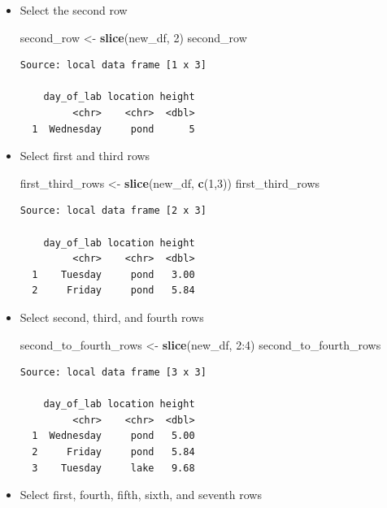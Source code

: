 \documentclass[twoside, 12pt]{article}
\newenvironment{Shaded}{\begin{snugshade}}{\end{snugshade}}
\newcommand{\KeywordTok}[1]{\textcolor[rgb]{0.13,0.29,0.53}{\textbf{{#1}}}}
\newcommand{\DecValTok}[1]{\textcolor[rgb]{0.00,0.00,0.81}{{#1}}}
\newcommand{\StringTok}[1]{\textcolor[rgb]{0.31,0.60,0.02}{{#1}}}
\newcommand{\NormalTok}[1]{{#1}}
\begin{document}
\begin{itemize}
\item
  Select the second row

\begin{Shaded}
\begin{Highlighting}[]
\NormalTok{second_row <-}\StringTok{ }\KeywordTok{slice}\NormalTok{(new_df, }\DecValTok{2}\NormalTok{)}
\NormalTok{second_row}
\end{Highlighting}
\end{Shaded}

  \begin{Verbatim}[frame=single]
  Source: local data frame [1 x 3]

    day_of_lab location height
         <chr>    <chr>  <dbl>
  1  Wednesday     pond      5
  \end{Verbatim}
\item
  Select first and third rows

\begin{Shaded}
\begin{Highlighting}[]
\NormalTok{first_third_rows <-}\StringTok{ }\KeywordTok{slice}\NormalTok{(new_df, }\KeywordTok{c}\NormalTok{(}\DecValTok{1}\NormalTok{,}\DecValTok{3}\NormalTok{))}
\NormalTok{first_third_rows }
\end{Highlighting}
\end{Shaded}

  \begin{Verbatim}[frame=single]
  Source: local data frame [2 x 3]

    day_of_lab location height
         <chr>    <chr>  <dbl>
  1    Tuesday     pond   3.00
  2     Friday     pond   5.84
  \end{Verbatim}
\item
  Select second, third, and fourth rows

\begin{Shaded}
\begin{Highlighting}[]
\NormalTok{second_to_fourth_rows <-}\StringTok{ }\KeywordTok{slice}\NormalTok{(new_df, }\DecValTok{2}\NormalTok{:}\DecValTok{4}\NormalTok{)}
\NormalTok{second_to_fourth_rows}
\end{Highlighting}
\end{Shaded}

  \begin{Verbatim}[frame=single]
  Source: local data frame [3 x 3]

    day_of_lab location height
         <chr>    <chr>  <dbl>
  1  Wednesday     pond   5.00
  2     Friday     pond   5.84
  3    Tuesday     lake   9.68
  \end{Verbatim}
\item
  Select first, fourth, fifth, sixth, and seventh rows


\end{itemize}
\end{document}
